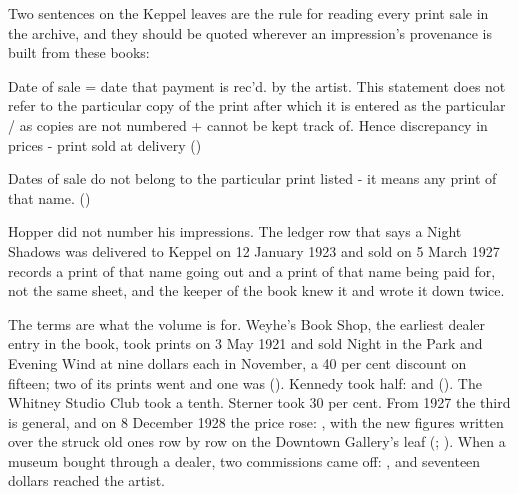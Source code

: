 Two sentences on the Keppel leaves are the rule for reading every print sale in the archive, and they should be quoted wherever an impression's provenance is built from these books:

\begin{leafquote}
Date of sale = date that payment is rec'd. by the artist. This statement does not refer to the particular copy of the print after which it is entered as the particular / as copies are not numbered + cannot be kept track of. Hence discrepancy in prices - print sold at delivery \hfill ()
\end{leafquote}

\begin{leafquote}
Dates of sale do not belong to the particular print listed - it means any print of that name. \hfill ()
\end{leafquote}

\noindent Hopper did not number his impressions. The ledger row that says a Night Shadows was delivered to Keppel on 12 January 1923 and sold on 5 March 1927 records a print of that name going out and a print of that name being paid for, not the same sheet, and the keeper of the book knew it and wrote it down twice.

The terms are what the volume is for. Weyhe's Book Shop, the earliest dealer entry in the book, took prints on 3 May 1921 and sold Night in the Park and Evening Wind at nine dollars each in November, a 40 per cent discount on fifteen; two of its prints went  and one was  (). Kennedy took half:  and  (). The Whitney Studio Club took a tenth. Sterner took 30 per cent. From 1927 the third is general, and on 8 December 1928 the price rose: , with the new figures written over the struck old ones row by row on the Downtown Gallery's leaf (; ). When a museum bought through a dealer, two commissions came off: , and seventeen dollars reached the artist.

